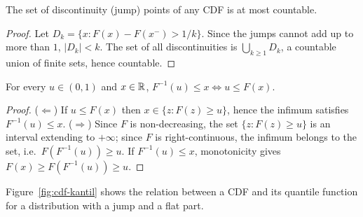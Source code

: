 \documentclass[main.tex]{subfiles}
\begin{document}
\begin{proposition}
The set of discontinuity (jump) points of any CDF is at most countable.
\end{proposition}
\begin{proof}
Let $D_k=\{x: F(x)-F(x^-)>1/k\}$. Since the jumps cannot add up to more than $1$, $|D_k|<k$. The set of all discontinuities is $\bigcup_{k\ge1}D_k$, a countable union of finite sets, hence countable.
\end{proof}

\begin{lemma}\label{lem:kantil}
For every $u\in(0,1)$ and $x\in\mathbb{R}$, $F^{-1}(u)\le x \iff u\le F(x)$.
\end{lemma}
\begin{proof}
($\Leftarrow$) If $u\le F(x)$ then $x\in\{z:F(z)\ge u\}$, hence the infimum satisfies $F^{-1}(u)\le x$.
($\Rightarrow$) Since $F$ is non-decreasing, the set $\{z:F(z)\ge u\}$ is an interval extending to $+\infty$; since $F$ is right-continuous, the infimum belongs to the set, i.e.\ $F(F^{-1}(u))\ge u$. If $F^{-1}(u)\le x$, monotonicity gives $F(x)\ge F(F^{-1}(u))\ge u$.
\end{proof}

Figure~\ref{fig:cdf-kantil} shows the relation between a CDF and its quantile function for a distribution with a jump and a flat part.
\end{document}
